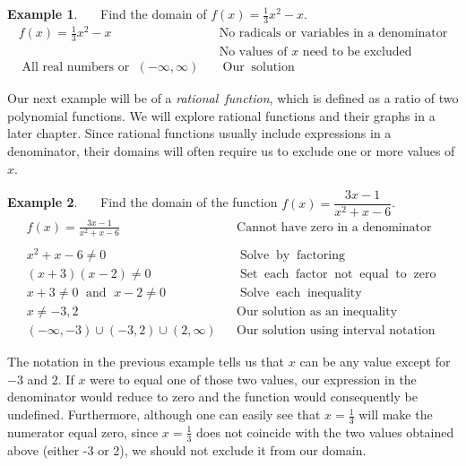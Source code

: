 \documentclass[12pt]{book}
\theoremstyle{definition}
\newtheorem{example}{Example}
\newcommand{\tmop}[1]{\ensuremath{\operatorname{#1}}}
\begin{document}
\begin{example}~~~Find the domain of $f(x)=\frac{1}{3} x^2-x$.
  \begin{eqnarray*}
    f (x) = \frac{1}{3} x^2 - x & & \text{No~radicals~or~variables~in~a~denominator}\\
		& & \text{No~values~of~} x\text{~need~to~be~excluded}\\
		\tmop{All~real~numbers~or~}(-\infty,\infty) & & \tmop{Our} \tmop{solution}
 \end{eqnarray*}
 \end{example}
Our next example will be of a {\it rational~function}, which is defined as a ratio of two polynomial functions.  We will explore rational functions and their graphs in a later chapter.  Since rational functions usually include expressions in a denominator, their domains will often require us to exclude one or more values of $x$.
\begin{example}~~~Find the domain of the function $f (x) = \dfrac{3 x - 1}{x^2 + x - 6}$.
  \begin{eqnarray*}
    f (x) = \frac{3 x - 1}{x^2 + x - 6}
    &  & \tmop{Cannot~have~zero~in~a~denominator}\\
		& & \\
    x^2 + x - 6 \neq 0 &  & \tmop{Solve} \tmop{by} \tmop{factoring}\\
    (x + 3) (x - 2) \neq 0 &  & \tmop{Set} \tmop{each} \tmop{factor}
    \tmop{not} \tmop{equal} \tmop{to} \tmop{zero}\\
    x + 3 \neq 0 \tmop{~and~} x - 2 \neq 0 &  & \tmop{Solve} \tmop{each}
    \tmop{inequality}\\
    x \neq - 3, 2 &  & \tmop{Our~solution~as~an~inequality}\\
		(-\infty,-3)\cup(-3,2)\cup(2,\infty) & & \text{Our~solution~using~interval~notation}
  \end{eqnarray*}
\end{example}
The notation in the previous example tells us that $x$ can be any value except for $- 3$ and $2$. If $x$ were to equal one of those two values, our expression in the denominator would reduce to zero and the function
would consequently be undefined.  Furthermore, although one can easily see that $x=\frac{1}{3}$ will make the numerator equal zero, since $x=\frac{1}{3}$ does not coincide with the two values obtained above (either -3 or 2), we should not exclude it from our domain.\par
\end{document}
